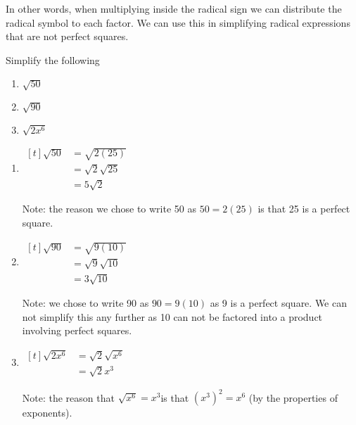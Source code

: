 In other words, when multiplying inside the radical sign we can distribute the radical
symbol to each \gls{factor}. We can use this in simplifying radical expressions that are not
perfect squares.

\begin{myexample}\label{ex:multradicals}
Simplify the following
\begin{multicols}{3}
	\begin{enumerate}
		\item $\sqrt{50}$
		\item $\sqrt{90}$
		\item $\sqrt{2x^6}$
	\end{enumerate} 
\end{multicols}
\end{myexample}
\begin{myProof}
	\begin{enumerate}
		\item 
		$\begin{aligned}[t]
			\sqrt{50} & =  \sqrt{2(25)}      \\
			          & =  \sqrt{2}\sqrt{25} \\
			          & =  5\sqrt{2}         
		\end{aligned}$
						
		Note: the reason we chose to write 50 as $50=2(25)$ is that 25 is a perfect square.
		\item 
		$\begin{aligned}[t]
			\sqrt{90} & =  \sqrt{9(10)}      \\
			          & =  \sqrt{9}\sqrt{10} \\
			          & =  3\sqrt{10}        
		\end{aligned}$
						
		Note:  we chose to write 90 as $90=9(10)$ as 9 is a perfect square. We can not simplify this any
		further as 10 can not be factored into a product involving perfect squares.
		\item 
		$\begin{aligned}[t]
			\sqrt{2x^6} & =  \sqrt{2}\sqrt{x^6} \\
			            & =  \sqrt{2}x^3        
		\end{aligned}$
						
		Note: the reason that $\sqrt{x^6}=x^3$is that $(x^3)^2 = x^6$ (by the properties of exponents).
	\end{enumerate} 
\end{myProof} 

